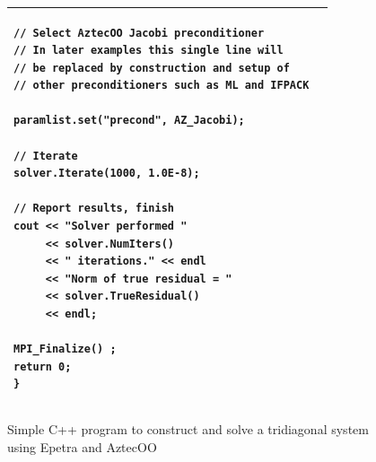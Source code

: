 \documentclass[acmtoms,acmnow]{acmtrans2m}
\begin{document}
\begin{figure}
{\begin{tabular}{|p{2.4in}|p{2.4in}|}
\begin{verbatim}
// Select AztecOO Jacobi preconditioner
// In later examples this single line will
// be replaced by construction and setup of
// other preconditioners such as ML and IFPACK

paramlist.set("precond", AZ_Jacobi);

// Iterate
solver.Iterate(1000, 1.0E-8);

// Report results, finish     
cout << "Solver performed " 
     << solver.NumIters()  
     << " iterations." << endl
     << "Norm of true residual = " 
     << solver.TrueResidual() 
     << endl;

MPI_Finalize() ;
return 0;
}
\end{verbatim}
\\\hline
\end{tabular}}
\caption{\label{fig:solvetrid} Simple C++ program to construct and
solve a tridiagonal system using Epetra and AztecOO}
\end{figure}
\end{document}
